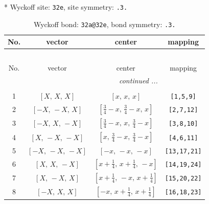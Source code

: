 \documentclass[fleqn,8pt]{jsarticle}
\begin{document}
* Wyckoff site: {\tt 32e}, site symmetry: {\tt .3.}
\renewcommand{\arraystretch}{1.2}
\begin{longtable}{cccc}
\caption{Wyckoff bond: {\tt 32a@32e}, bond symmetry: {\tt .3.}}
 \\
 \hline \hline
No. & vector & center & mapping \\ \hline \endfirsthead

\multicolumn{3}{l}{\tablename\ \thetable{}} \\
 \hline \hline
No. & vector & center & mapping \\ \hline \endhead

 \hline \hline
\multicolumn{3}{r}{\footnotesize\it continued ...} \\ \endfoot

 \hline \hline
\multicolumn{3}{r}{} \\ \endlastfoot

1 & $\left[ X,\, X,\, X \right]$ & $\left[ x,\, x,\, x \right]$ & {\tt [1,5,9]} \\ \hline
2 & $\left[ - X,\, - X,\, X \right]$ & $\left[ \frac{3}{4} - x,\, \frac{3}{4} - x,\, x \right]$ & {\tt [2,7,12]} \\ \hline
3 & $\left[ - X,\, X,\, - X \right]$ & $\left[ \frac{3}{4} - x,\, x,\, \frac{3}{4} - x \right]$ & {\tt [3,8,10]} \\ \hline
4 & $\left[ X,\, - X,\, - X \right]$ & $\left[ x,\, \frac{3}{4} - x,\, \frac{3}{4} - x \right]$ & {\tt [4,6,11]} \\ \hline
5 & $\left[ - X,\, - X,\, - X \right]$ & $\left[ - x,\, - x,\, - x \right]$ & {\tt [13,17,21]} \\ \hline
6 & $\left[ X,\, X,\, - X \right]$ & $\left[ x + \frac{1}{4},\, x + \frac{1}{4},\, - x \right]$ & {\tt [14,19,24]} \\ \hline
7 & $\left[ X,\, - X,\, X \right]$ & $\left[ x + \frac{1}{4},\, - x,\, x + \frac{1}{4} \right]$ & {\tt [15,20,22]} \\ \hline
8 & $\left[ - X,\, X,\, X \right]$ & $\left[ - x,\, x + \frac{1}{4},\, x + \frac{1}{4} \right]$ & {\tt [16,18,23]} \\
\end{longtable}
\renewcommand{\arraystretch}{1.2}
\end{document}
